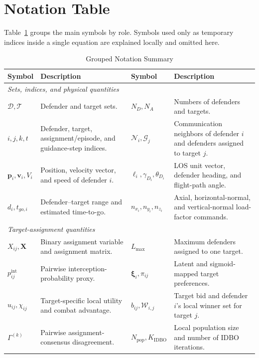 \section{Notation Table}
\label{app:notation}

Table~\ref{tab:notation} groups the main symbols by role. Symbols used only as temporary
indices inside a single equation are explained locally and omitted here.

\begin{table}[!t]
\centering
\caption{Grouped Notation Summary}
\label{tab:notation}
\renewcommand{\arraystretch}{1.12}
\footnotesize
\begin{tabular}{@{}p{}p{}p{}p{}@{}}
\toprule
Symbol & Description & Symbol & Description \\
\midrule
\multicolumn{4}{l}{\emph{Sets, indices, and physical quantities}}\\
$\mathcal D,\mathcal T$ & Defender and target sets. &
$N_D,N_A$ & Numbers of defenders and targets.\\
$i,j,k,t$ & Defender, target, assignment/episode, and guidance-step indices. &
$\mathcal N_i,\mathcal G_j$ & Communication neighbors of defender $i$ and defenders assigned to target $j$.\\
$\mathbf p_i,\mathbf v_i,V_i$ & Position, velocity vector, and speed of defender $i$. &
$\boldsymbol\ell_i,\gamma_{D_i},\theta_{D_i}$ & LOS unit vector, defender heading, and flight-path angle.\\
$d_i,t_{go,i}$ & Defender--target range and estimated time-to-go. &
$n_{x_i},n_{y_i},n_{z_i}$ & Axial, horizontal-normal, and vertical-normal load-factor commands.\\
\midrule
\multicolumn{4}{l}{\emph{Target-assignment quantities}}\\
$X_{ij},\mathbf X$ & Binary assignment variable and assignment matrix. &
$L_{\max}$ & Maximum defenders assigned to one target.\\
$p_{ij}^{\mathrm{int}}$ & Pairwise interception-probability proxy. &
$\boldsymbol\xi_i,\pi_{ij}$ & Latent and sigmoid-mapped target preferences.\\
$u_{ij},\chi_{ij}$ & Target-specific local utility and combat advantage. &
$b_{ij},\mathcal W_{i,j}$ & Target bid and defender $i$'s local winner set for target $j$.\\
$\Gamma^{(k)}$ & Pairwise assignment-consensus disagreement. &
$N_{\mathrm{pop}},K_{\mathrm{IDBO}}$ & Local population size and number of IDBO iterations.\\

\end{tabular}
\end{table}
